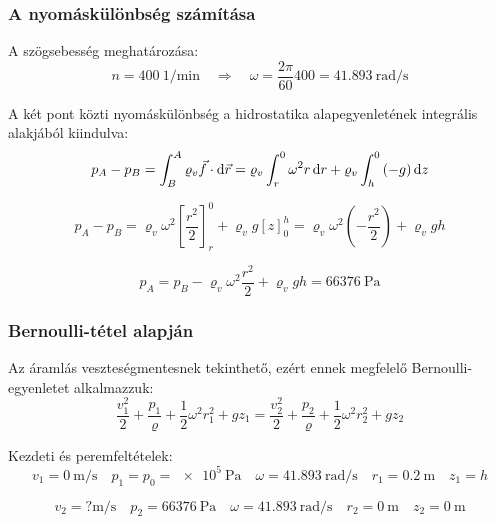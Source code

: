 \subsubsection{A nyomáskülönbség számítása}
\noindent A szögsebesség meghatározása:
\begin{equation}
	n = \SI{400}{1\per\minute}
	\quad 
	\Rightarrow
	\quad 
	\omega = \dfrac{2 \pi}{60} 400 = \SI{41,893}{\radian\per\second}
\end{equation}

\noindent A két pont közti nyomáskülönbség a hidrostatika alapegyenletének integrális alakjából kiindulva: 
\begin{equation}
 	p_{A} - p_{B} = \int_{B}^{A} \varrho_{v} \vec{f} \cdot \dif \vec{r}
 	=
 	\varrho_{v} \int_{r}^{0} \omega ^{2} r \dif r 
 	+ 
 	\varrho_{v} \int_{h}^{0} \left( -g \right) \dif z 	
\end{equation}

\begin{equation}
	p_{A} - p_{B} = \varrho_{v} \omega ^{2} \left[ \dfrac{r^{2}}{2}\right]_{r}^{0}
	+
	\varrho_{v} g \left[ z\right]_{0}^{h}
	=
	\varrho_{v} \omega ^{2} \left( - \dfrac{r^{2}}{2}\right)
	+ \varrho_{v} g h
\end{equation}

\begin{equation}
	p_{A} = p_{B} - \varrho_{v} \omega ^{2} \dfrac{r^{2}}{2}
	+
	\varrho_{v} g h	
	=
	\SI{66 376}{\pascal}
\end{equation}
\subsubsection{Bernoulli-tétel alapján}
\noindent Az áramlás veszteségmentesnek tekinthető, ezért ennek megfelelő Bernoulli-egyenletet alkalmazzuk:
\begin{equation}
	\dfrac{v_{1}^{2}}{2} + \dfrac{p_{1}}{\varrho} + \dfrac{1}{2} \omega ^{2} r_{1}^{2} + gz_{1}
	=
	\dfrac{v_{2}^{2}}{2} + \dfrac{p_{2}}{\varrho} + \dfrac{1}{2} \omega ^{2} r_{2}^{2} + gz_{2}
\end{equation}

\noindent Kezdeti és peremfeltételek: 
\begin{equation*}
	v_{1} = \SI{0}{\meter\per\second}  
	\quad
	p_{1} = p_{0} = \SI{e5}{\pascal}  
	\quad
	\omega = \SI{41,893}{\radian\per\second}
	\quad
	r_{1} = \SI{0,2}{\meter}
	\quad
	z_{1} = h
\end{equation*}

\begin{equation*}
	v_{2} = ? \si{\meter\per\second} 
	\quad
	p_{2} = \SI{66 376}{\pascal}  
	\quad
	\omega = \SI{41,893}{\radian\per\second}
	\quad
	r_{2} = \SI{0}{\meter}
	\quad
	z_{2} = \SI{0}{\meter}
\end{equation*}

